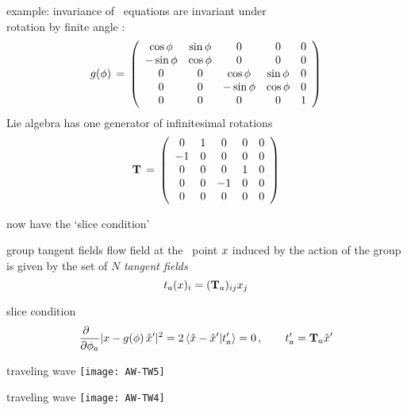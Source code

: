 \begin{frame}{example:  invariance of \cLe}
\cLe\ equations are invariant under
\\
 rotation by finite angle \gSpace:
\[
\LieEl(\gSpace) \,=\,  \left(\barr{ccccc}
  \cos \gSpace  & \sin \gSpace  & 0 & 0 & 0 \\
 -\sin \gSpace  & \cos \gSpace  & 0 & 0 & 0 \\
 0 & 0 &  \cos \gSpace & \sin \gSpace   & 0 \\
 0 & 0 & -\sin \gSpace & \cos \gSpace   & 0 \\
 0 & 0 & 0             & 0              & 1
    \earr\right)
\] %
 Lie algebra has one generator
of infinitesimal rotations
\[
 \Lg \,=\,   \left(\barr{ccccc}
    0  &  1 & 0  &  0 & 0  \\
   -1  &  0 & 0  &  0 & 0 \\
    0  &  0 & 0  &  1 & 0  \\
    0  &  0 &-1  &  0 & 0 \\
    0  &  0 & 0  &  0 & 0
    \earr\right)
\] %
\end{frame}

\begin{frame}{now have the `slice condition'}
\begin{block}{group tangent fields}
flow field at the \statesp\
point $\ssp$ induced by the action of the group is given by
the set of $N$ \emph{tangent fields}
\[
\groupTan_a(\ssp)_{i}= (\Lg_a){}_{ij} \ssp_j
\] %
\end{block}
\bigskip
\begin{block}{slice condition}
\[ %
\frac{\partial ~~}{\partial \gSpace_a} |\ssp - \LieEl(\gSpace)\,\slicep|^2
   =
2\, \braket{\sspRed - \slicep}{\sliceTan{a}}
   = 0
    \,,\qquad
	  \sliceTan{a} = \Lg_a \slicep
\] %
\end{block}
\end{frame}

\begin{frame}{traveling wave}
\texttt{[image: AW-TW5]}
\end{frame}


\begin{frame}{traveling wave}
\texttt{[image: AW-TW4]}
\end{frame}


